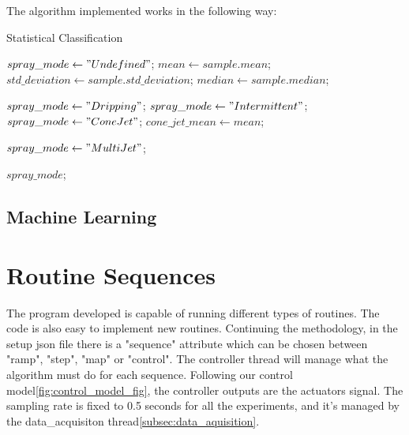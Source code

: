 	The algorithm implemented works in the following way:
	\begin{algorithm}
        \caption{Statistical Classification}\label{alg:statistical_class}
        \begin{algorithmic}

            \State $spray\_mode \gets "Undefined"$;
            \State $mean \gets sample.mean$; 
            \State $std\_deviation \gets sample.std\_deviation$;
            \State $median \gets sample.median$;
            
                \State $spray\_mode \gets "Dripping"$;
                \State $spray\_ mode \gets "Intermittent"$;
                \State $spray\_ mode \gets "Cone Jet"$;
                \State $cone\_jet\_mean \gets mean$;
            \EndIf

            \EndIf

                    \State $spray\_ mode \gets "Multi Jet"$;
                \EndIf
            \EndIf

            \Return $spray\_ mode$;
        \EndFunction
        \end{algorithmic}
    \end{algorithm}


\subsection{Machine Learning}


\section{Routine Sequences}
\label{sec:routine_sequences}

    The program developed is capable of running different types of routines. The code is also easy to implement new routines.
    Continuing the methodology, in the setup json file there is a "sequence" attribute which can be chosen between "ramp", "step", "map" or "control".
    The controller thread will manage what the algorithm must do for each sequence.
    Following our control model\ref{fig:control_model_fig}, the controller outputs are the actuators signal.
    The sampling rate is fixed to 0.5 seconds for all the experiments, and it's managed by the data\_acquisiton thread\ref{subsec:data_aquisition}.



